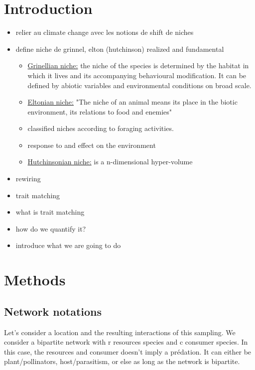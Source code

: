 \documentclass{article}
\begin{document}
\section{Introduction}

\begin{itemize}
    \item relier au climate change avec les notions de shift de niches
    \item define niche de grinnel, elton (hutchinson) realized and fundamental
    \begin{itemize}
        \item \underline{Grinellian niche:} the niche of the species is determined by the habitat in which it lives and its accompanying behavioural modification. It can be defined by abiotic variables and environmental conditions on broad scale.
        \item \underline{Eltonian niche:} "The niche of an animal means its place in the biotic environment, its relations to food and enemies"
        \item classified niches according to foraging activities.
        \item response to and effect on the environment
        \item \underline{Hutchinsonian niche:} is a n-dimensional hyper-volume
    \end{itemize}
    \item rewiring
    \item trait matching
        \item what is trait matching
        \item how do we quantify it?
    \item introduce what we are going to do
\end{itemize}










\section{Methods}

\subsection{Network notations}
Let's consider a location and the resulting interactions of this sampling. We consider a bipartite network with r resources species and c consumer species. In this case, the resources and consumer doesn't imply a prédation. It can either be plant/pollinators, host/parasitism, or else as long as the network is bipartite. 
\end{document}
